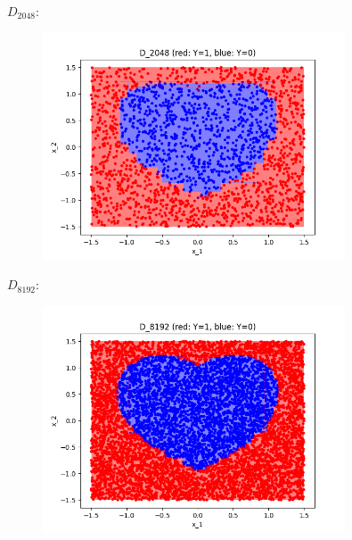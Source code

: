 \documentclass[a4paper]{article}
\theoremstyle{definition}
\newenvironment{soln}{
    \leavevmode\color{blue}\ignorespaces
}{}
\begin{document}
\begin{enumerate}
\begin{soln}
\begin{figure}[h!]
        \captionsetup{labelformat=empty}
        \caption{}
        \label{fig:mixed}
    \end{figure}
    \\ $D_{2048}$:
    \begin{figure}[h!]
        \centering
        \includegraphics[width=0.8\textwidth]{images/D_2048ScatterDecisionBoundary.png}  
        \captionsetup{labelformat=empty}
        \caption{}
        \label{fig:mixed}
    \end{figure}
    \newpage
    $D_{8192}$:
    \begin{figure}[h!]
        \centering
        \includegraphics[width=0.8\textwidth]{images/D_8192ScatterDecisionBoundary.png}  
        \captionsetup{labelformat=empty}
        \caption{}
        \label{fig:mixed}
    \end{figure}
  \end{soln}
    
\end{enumerate}
\end{document}
